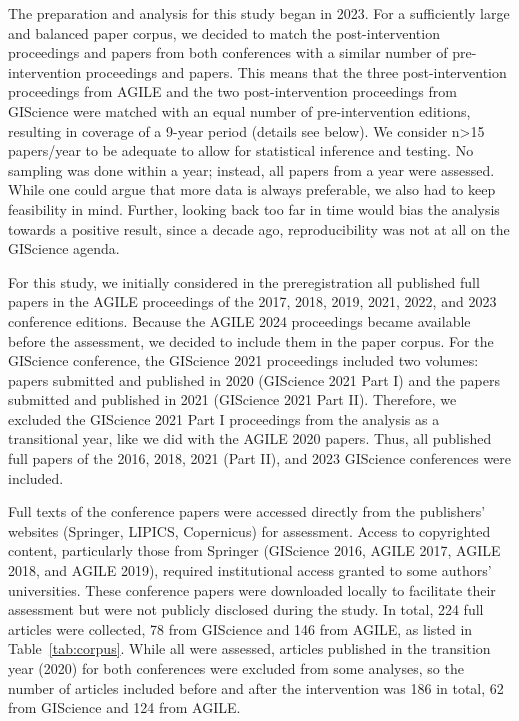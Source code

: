 \documentclass{josis}
\begin{document}
The preparation and analysis for this study began in 2023. 
For a sufficiently large and balanced paper corpus, we decided to match the post-intervention proceedings and papers from both conferences with a similar number of pre-intervention proceedings and papers. 
This means that the three post-intervention proceedings from AGILE and the two post-intervention proceedings from GIScience were matched with an equal number of pre-intervention editions, resulting in coverage of a 9-year period (details see below). 
We consider n>15 papers/year to be adequate to allow for statistical inference and testing. No sampling was done within a year; instead, all papers from a year were assessed.   
While one could argue that more data is always preferable, we also had to keep feasibility in mind. 
Further, looking back too far in time would bias the analysis towards a positive result, since a decade ago, reproducibility was not at all on the GIScience agenda.

For this study, we initially considered in the preregistration all published full papers in the AGILE proceedings of the 2017, 2018, 2019, 2021, 2022, and 2023 conference editions. 
Because the AGILE 2024 proceedings became available before the assessment, we decided to include them in the paper corpus. 
For the GIScience conference, the GIScience 2021 proceedings included two volumes: papers submitted and published in 2020 (GIScience 2021 Part I) and the papers submitted and published in 2021 (GIScience 2021 Part II). Therefore, we excluded the GIScience 2021 Part I proceedings from the analysis as a transitional year, like we did with the AGILE 2020 papers. Thus, all published full papers of the 2016, 2018, 2021 (Part II), and 2023 GIScience conferences were included.

Full texts of the conference papers were accessed directly from the publishers' websites (Springer, LIPICS, Copernicus) for assessment. Access to copyrighted content, particularly those from Springer (GIScience 2016, AGILE 2017, AGILE 2018, and AGILE 2019), required institutional access granted to some authors' universities.
These conference papers were downloaded locally to facilitate their assessment but were not publicly disclosed during the study.
In total, 224 full articles were collected, 78 from GIScience and 146 from AGILE, as listed in Table~\ref{tab:corpus}.
While all were assessed, articles published in the transition year (2020) for both conferences were excluded from some analyses, so the number of articles included before and after the intervention was 186 in total, 62 from GIScience and 124 from AGILE.
\end{document}
